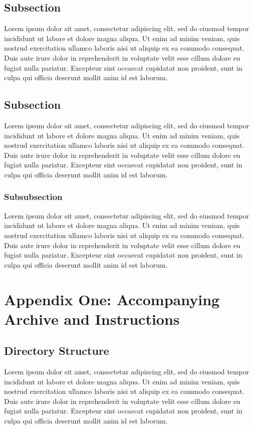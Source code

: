 \documentclass[twoside,12pt,a4paper]{article}
\begin{document}
\subsection{Subsection}
Lorem ipsum dolor sit amet, consectetur adipiscing elit, sed do eiusmod tempor incididunt ut labore et dolore magna aliqua. Ut enim ad minim veniam, quis nostrud exercitation ullamco laboris nisi ut aliquip ex ea commodo consequat. Duis aute irure dolor in reprehenderit in voluptate velit esse cillum dolore eu fugiat nulla pariatur. Excepteur sint occaecat cupidatat non proident, sunt in culpa qui officia deserunt mollit anim id est laborum.

\subsection{Subsection}
Lorem ipsum dolor sit amet, consectetur adipiscing elit, sed do eiusmod tempor incididunt ut labore et dolore magna aliqua. Ut enim ad minim veniam, quis nostrud exercitation ullamco laboris nisi ut aliquip ex ea commodo consequat. Duis aute irure dolor in reprehenderit in voluptate velit esse cillum dolore eu fugiat nulla pariatur. Excepteur sint occaecat cupidatat non proident, sunt in culpa qui officia deserunt mollit anim id est laborum.

\subsubsection{Subsubsection}
Lorem ipsum dolor sit amet, consectetur adipiscing elit, sed do eiusmod tempor incididunt ut labore et dolore magna aliqua. Ut enim ad minim veniam, quis nostrud exercitation ullamco laboris nisi ut aliquip ex ea commodo consequat. Duis aute irure dolor in reprehenderit in voluptate velit esse cillum dolore eu fugiat nulla pariatur. Excepteur sint occaecat cupidatat non proident, sunt in culpa qui officia deserunt mollit anim id est laborum.

\clearpage
\lhead{}\rhead{}
{}



\clearpage
\section{Appendix One: Accompanying Archive and Instructions}
\label{section:appendix}
\subsection{Directory Structure}
Lorem ipsum dolor sit amet, consectetur adipiscing elit, sed do eiusmod tempor incididunt ut labore et dolore magna aliqua. Ut enim ad minim veniam, quis nostrud exercitation ullamco laboris nisi ut aliquip ex ea commodo consequat. Duis aute irure dolor in reprehenderit in voluptate velit esse cillum dolore eu fugiat nulla pariatur. Excepteur sint occaecat cupidatat non proident, sunt in culpa qui officia deserunt mollit anim id est laborum.
\end{document}
